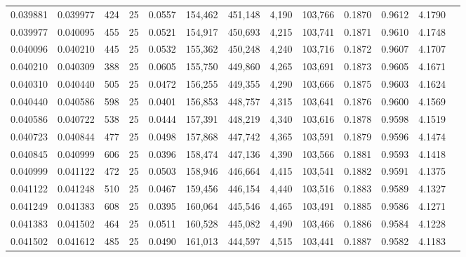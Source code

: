 \begin{tabular}{rrrrrrrrrrrrr}
0.039881 & 0.039977 &   424 &  25 &                                     0.0557 & 154,462 & 451,148 &   4,190 & 103,766 & 0.1870 & 0.9612 & 4.1790 \\
0.039977 & 0.040095 &   455 &  25 &                                     0.0521 & 154,917 & 450,693 &   4,215 & 103,741 & 0.1871 & 0.9610 & 4.1748 \\
0.040096 & 0.040210 &   445 &  25 &                                     0.0532 & 155,362 & 450,248 &   4,240 & 103,716 & 0.1872 & 0.9607 & 4.1707 \\
0.040210 & 0.040309 &   388 &  25 &                                     0.0605 & 155,750 & 449,860 &   4,265 & 103,691 & 0.1873 & 0.9605 & 4.1671 \\
0.040310 & 0.040440 &   505 &  25 &                                     0.0472 & 156,255 & 449,355 &   4,290 & 103,666 & 0.1875 & 0.9603 & 4.1624 \\
0.040440 & 0.040586 &   598 &  25 &                                     0.0401 & 156,853 & 448,757 &   4,315 & 103,641 & 0.1876 & 0.9600 & 4.1569 \\
0.040586 & 0.040722 &   538 &  25 &                                     0.0444 & 157,391 & 448,219 &   4,340 & 103,616 & 0.1878 & 0.9598 & 4.1519 \\
0.040723 & 0.040844 &   477 &  25 &                                     0.0498 & 157,868 & 447,742 &   4,365 & 103,591 & 0.1879 & 0.9596 & 4.1474 \\
0.040845 & 0.040999 &   606 &  25 &                                     0.0396 & 158,474 & 447,136 &   4,390 & 103,566 & 0.1881 & 0.9593 & 4.1418 \\
0.040999 & 0.041122 &   472 &  25 &                                     0.0503 & 158,946 & 446,664 &   4,415 & 103,541 & 0.1882 & 0.9591 & 4.1375 \\
0.041122 & 0.041248 &   510 &  25 &                                     0.0467 & 159,456 & 446,154 &   4,440 & 103,516 & 0.1883 & 0.9589 & 4.1327 \\
0.041249 & 0.041383 &   608 &  25 &                                     0.0395 & 160,064 & 445,546 &   4,465 & 103,491 & 0.1885 & 0.9586 & 4.1271 \\
0.041383 & 0.041502 &   464 &  25 &                                     0.0511 & 160,528 & 445,082 &   4,490 & 103,466 & 0.1886 & 0.9584 & 4.1228 \\
0.041502 & 0.041612 &   485 &  25 &                                     0.0490 & 161,013 & 444,597 &   4,515 & 103,441 & 0.1887 & 0.9582 & 4.1183 \\

\end{tabular}

